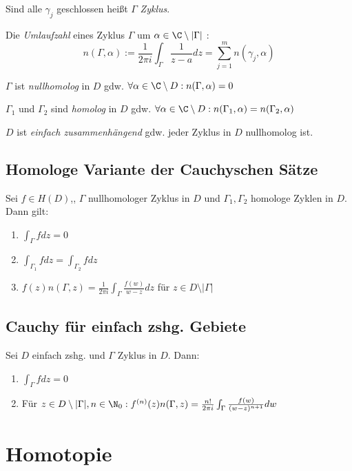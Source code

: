 Sind alle \(\gamma_j\) geschlossen heißt \(\Gamma\) \emph{Zyklus}.

Die \emph{Umlaufzahl} eines Zyklus \(\Gamma\) um \(\alpha \in \C \setminus |\Gamma|\) : \[n(\Gamma,\alpha) := \frac{1}{2\pi i} \int_\Gamma \frac{1}{z-a} dz = \sum_{j=1}^m n(\gamma_j,\alpha)\]

\(\Gamma\) ist \emph{nullhomolog} in \(D\) gdw. \(\forall \alpha \in \C \setminus D : n(\Gamma,\alpha) = 0\)

\(\Gamma_1\) und \(\Gamma_2\) sind \emph{homolog} in \(D\) gdw. \(\forall \alpha \in \C \setminus D : n(\Gamma_1,\alpha) = n(\Gamma_2,\alpha)\)

\(D\) ist \emph{einfach zusammenhängend} gdw. jeder Zyklus in \(D\) nullhomolog ist.

\subsection*{Homologe Variante der Cauchyschen Sätze}

Sei \(f \in H(D)\),, \(\Gamma\) nullhomologer Zyklus in \(D\) und \(\Gamma_1,\Gamma_2\) homologe Zyklen in \(D\). Dann gilt:

\begin{enumerate}[label=(\alph*)]
	\item \(\int_\Gamma f dz = 0\)
	\item \(\int_{\Gamma_1} f dz = \int_{\Gamma_2} f dz\)
	\item \(f(z) n(\Gamma,z) = \frac{1}{2\pi i} \int_\Gamma \frac{f(w)}{w-z} dz\) für \(z \in D \setminus |\Gamma|\)
\end{enumerate}

\subsection*{Cauchy für einfach zshg. Gebiete}

Sei \(D\) einfach zshg. und \(\Gamma\) Zyklus in \(D\). Dann:

\begin{enumerate}[label=(\alph*)]
	\item \(\int_\Gamma f dz = 0\)
	\item Für \(z \in D \setminus |\Gamma|, n \in \N_0 : \\ f^{(n)}(z) n(\Gamma,z) = \frac{n!}{2\pi i} \int_\Gamma \frac{f(w)}{(w-z)^{n+1}} dw\)
\end{enumerate}

\section*{Homotopie}

